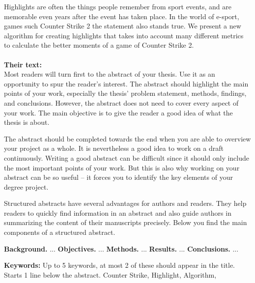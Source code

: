 \documentclass[a4paper,twoside]{bth}
\begin{document}
\abstract

Highlights are often the things people remember from sport events, and are memorable even years after the event has taken place. In the world of e-sport, games such Counter Strike 2 the statement also stands true. We present a new algorithm for creating highlights that takes into account many different metrics to calculate the better moments of a game of Counter Strike 2.
\\\\
\textbf{Their text:}\\
Most readers will turn first to the abstract of your thesis. Use it as an opportunity to spur the reader's interest. The abstract should highlight the main points of your work, especially the thesis' problem statement, methods, findings, and conclusions. However, the abstract does not need to cover every aspect of your work. The main objective is to give the reader a good idea of what the thesis is about.

The abstract should be completed towards the end when you are able to overview your project as a whole. It is nevertheless a good idea to work on a draft continuously. Writing a good abstract can be difficult since it should only include the most important points of your work. But this is also why working on your abstract can be so useful -- it forces you to identify the key elements of your degree project.

Structured abstracts have several advantages for authors and readers. They help readers to quickly find information in an abstract and also guide authors in summarizing the content of their manuscripts precisely. Below you find the main components of a structured abstract.

\noindent
\textbf{Background.} ... \newline
\textbf{Objectives.} ... \newline
\textbf{Methods.} ... \newline
\textbf{Results.} ... \newline
\textbf{Conclusions.} ...

\vspace{1cm}
\noindent
\textbf{Keywords:} Up to 5 keywords, at most 2 of these should appear in the title. Starts 1 line below the abstract.
Counter Strike, Highlight, Algorithm, 
\cleardoublepage
\end{document}
